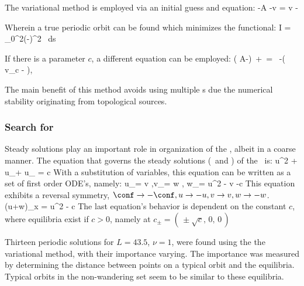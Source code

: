 The variational method is employed via an initial guess and equation:
\beq
{}
-\lambda A \frac{\partial \tilde{\conf}}{\partial \tau}
-v\frac{\partial \lambda}{\partial \tau} = \lambda v - 
\eeq

Wherein a true periodic orbit can be found which minimizes the functional:
\beq
I = \int_{0}^{2\pi}\left(-\lambda {}\right)^2 \, ds
\eeq

If there is a parameter $c$, a different equation can be employed:
\beq
\left( A-\lambda {}\right)\,
\frac{\partial \conf}{\partial \tau}+\, =
\, -\left(\,v_c - \lambda {}\right),
\eeq

The main benefit of this method avoids using multiple \PoincSec s due the numerical stability originating from topological sources.

\subsubsection{Search for \eqva}
\label{sect:MNGsearchEqva}


Steady solutions play an important role in organization of the \statesp,
albeit in a coarse manner. The equation that governs the steady solutions
(\eqva\ and \reqva) of the \KSe\ is:
\beq
\nonumber
{}u^2 + u_\conf + u_{\conf \conf \conf} = c
\eeq
With a substitution of variables, this equation can be written as a set
of first order ODE's, namely:
\beq
\nonumber
u_\conf = v ,\quad v_\conf = w , \quad w_\conf = u^2 - v -c
\eeq
This equation exhibits a reversal symmetry, $\conf \rightarrow -\conf , u
\rightarrow -u , v \rightarrow v , w \rightarrow -w$.
\beq
\nonumber
(u+w)_x = u^2 - c
\eeq
The last equation's behavior is dependent on the constant $c$, where
equilibria exist if $c>0$, namely at $c_\pm = (\, \pm \sqrt{c}, \, 0, \,
0 \,)$

Thirteen periodic solutions for $L=43.5$, $\nu=1$, were found using the the variational method, with their importance varying. The importance was measured by determining the distance between points on a typical orbit and the equilibria. Typical orbits in the non-wandering set seem to
be similar to these equilibria.

